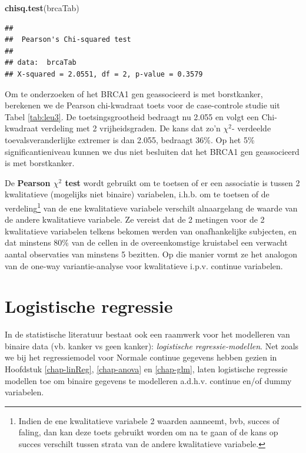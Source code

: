 \documentclass[
  12pt,dutch]{book}
\newenvironment{Shaded}{\begin{snugshade}}{\end{snugshade}}
\newcommand{\FunctionTok}[1]{\textcolor[rgb]{0.13,0.29,0.53}{\textbf{#1}}}
\newcommand{\NormalTok}[1]{#1}
\theoremstyle{definition}
\theoremstyle{definition}
\theoremstyle{definition}
\theoremstyle{definition}
\theoremstyle{remark}
\begin{document}
\begin{Shaded}
\begin{Highlighting}[]
\FunctionTok{chisq.test}\NormalTok{(brcaTab)}
\end{Highlighting}
\end{Shaded}

\begin{verbatim}
## 
##  Pearson's Chi-squared test
## 
## data:  brcaTab
## X-squared = 2.0551, df = 2, p-value = 0.3579
\end{verbatim}

Om te onderzoeken of het BRCA1 gen geassocieerd is met borstkanker, berekenen we de Pearson chi-kwadraat toets voor de case-controle studie uit Tabel \ref{tab:leu3}. De toetsingsgrootheid bedraagt nu 2.055 en volgt een Chi-kwadraat verdeling met 2 vrijheidsgraden. De kans dat zo'n \(\chi^2\)- verdeelde toevalsveranderlijke extremer is dan 2.055, bedraagt 36\%.
Op het 5\% significantieniveau kunnen we dus niet besluiten dat het BRCA1 gen geassocieerd is met borstkanker.

De \textbf{Pearson \(\chi^2\) test} wordt gebruikt om te toetsen of er een associatie is tussen 2 kwalitatieve (mogelijks niet binaire) variabelen, i.h.b. om te toetsen of de verdeling\footnote{Indien de ene kwalitatieve variabele 2 waarden aanneemt, bvb, succes of faling, dan kan deze toets gebruikt worden om na te gaan of de kans op succes verschilt tussen strata van de andere kwalitatieve variabele.} van de ene kwalitatieve variabele verschilt alnaargelang de waarde van de andere kwalitatieve variabele. Ze vereist dat de 2 metingen voor de 2 kwalitatieve variabelen telkens bekomen werden van onafhankelijke subjecten, en dat minstens 80\% van de cellen in de overeenkomstige kruistabel een verwacht aantal observaties van minstens 5 bezitten. Op die manier vormt ze het analogon van de one-way variantie-analyse voor kwalitatieve i.p.v. continue variabelen.

\section{Logistische regressie}\label{logistische-regressie}

In de statistische literatuur bestaat ook een raamwerk voor het modelleren van binaire data (vb. kanker vs geen kanker): \emph{logistische regressie-modellen}.
Net zoals we bij het regressiemodel voor Normale continue gegevens hebben gezien in Hoofdstuk \ref{chap-linReg}, \ref{chap-anova} en \ref{chap-glm}, laten logistische regressie modellen toe om binaire gegevens te modelleren a.d.h.v. continue en/of dummy variabelen.
\end{document}

